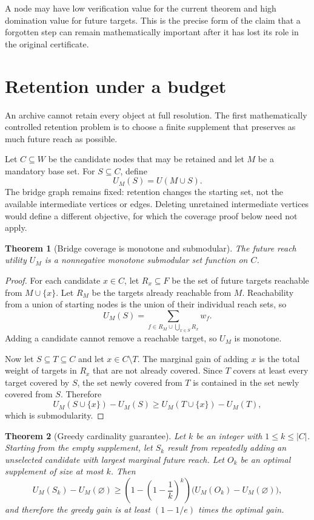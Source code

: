 \documentclass[11pt,oneside]{article}
\theoremstyle{komorebiplain}
\newtheorem{theorem}{Theorem}[section]
\theoremstyle{komorebidefinition}
\theoremstyle{komorebiremark}
\begin{document}
A node may have low verification value for the current theorem and high domination value for future targets. This is the precise form of the claim that a forgotten step can remain mathematically important after it has lost its role in the original certificate.


\section{Retention under a budget}
\label{sec:old14}

An archive cannot retain every object at full resolution. The first mathematically controlled retention problem is to choose a finite supplement that preserves as much future reach as possible.

Let $C\subseteq W$ be the candidate nodes that may be retained and let $M$ be a mandatory base set. For $S\subseteq C$, define
\[
U_M(S)=U(M\cup S).
\]
The bridge graph remains fixed: retention changes the starting set, not the available intermediate vertices or edges. Deleting unretained intermediate vertices would define a different objective, for which the coverage proof below need not apply.

\begin{theorem}[Bridge coverage is monotone and submodular]
\label{res:14:1}
\label{thm:bridge-submodular}
The future reach utility $U_M$ is a nonnegative monotone submodular set function on $C$.
\end{theorem}

\begin{proof}
For each candidate $x\in C$, let $R_x\subseteq F$ be the set of future targets reachable from $M\cup\{x\}$. Let $R_M$ be the targets already reachable from $M$. Reachability from a union of starting nodes is the union of their individual reach sets, so
\[
U_M(S)=
\sum_{f\in R_M\cup\bigcup_{x\in S}R_x}w_f.
\]
Adding a candidate cannot remove a reachable target, so $U_M$ is monotone.

Now let $S\subseteq T\subseteq C$ and let $x\in C\setminus T$. The marginal gain of adding $x$ is the total weight of targets in $R_x$ that are not already covered. Since $T$ covers at least every target covered by $S$, the set newly covered from $T$ is contained in the set newly covered from $S$. Therefore
\[
U_M(S\cup\{x\})-U_M(S)
\ge
U_M(T\cup\{x\})-U_M(T),
\]
which is submodularity.
\end{proof}

\begin{theorem}[Greedy cardinality guarantee]
\label{res:14:2}
\label{thm:bridge-greedy}
Let $k$ be an integer with $1\leq k\leq|C|$. Starting from the empty supplement, let $S_k$ result from repeatedly adding an unselected candidate with largest marginal future reach. Let $O_k$ be an optimal supplement of size at most $k$. Then
\[
U_M(S_k)-U_M(\varnothing)
\ge
\left(1-\left(1-\frac1k\right)^k\right)
\bigl(U_M(O_k)-U_M(\varnothing)\bigr),
\]
and therefore the greedy gain is at least $(1-1/e)$ times the optimal gain.
\end{theorem}
\end{document}
